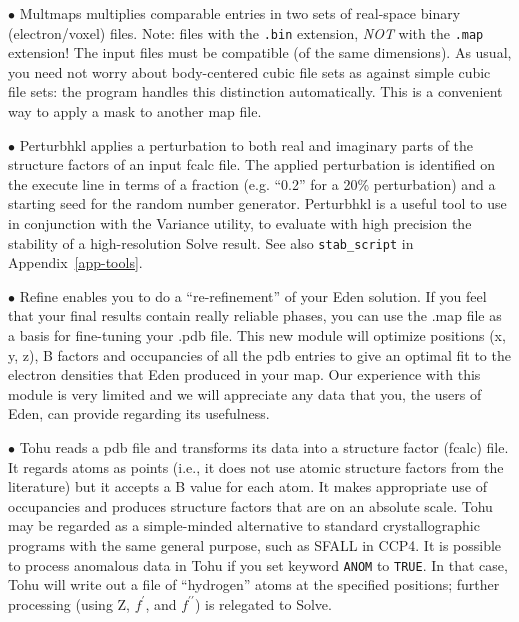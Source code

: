 \documentclass{report}
\begin{document}
{$\bullet$ Multmaps multiplies comparable entries in 
two sets of real-space binary (electron/voxel) files.  Note:  files with the
{\tt .bin} extension, {\em NOT} with the {\tt .map} extension!
The input files must be compatible (of the same 
dimensions).  As usual, you need not worry about body-centered cubic file sets
as against simple cubic file sets: the program handles this distinction 
automatically.  This is a convenient way to apply a mask to another map file.

$\bullet$ Perturbhkl applies a perturbation 
to both real and imaginary parts
of the structure factors of an input fcalc file.  The applied perturbation
is identified on the execute line in terms of a fraction (e.g. ``0.2'' for a
20\% perturbation) and a starting seed for the random number generator.
Perturbhkl is a useful tool to use in conjunction with the 
Variance
utility, to evaluate with high precision the stability of a high-resolution 
Solve result.  See also {\tt stab\_script} in Appendix~\ref{app-tools}.

$\bullet$ Refine enables you to do a ``re-refinement'' of your
Eden solution.  If you feel that your final results contain really reliable
phases, you can use the .map file as a basis for fine-tuning your .pdb file.
This new module will optimize positions (x, y, z), B factors and occupancies 
of all the pdb entries to give an optimal fit to the electron densities that
Eden produced in your map.  Our experience with this module is very limited
and we will appreciate any data that you, the users of Eden, can provide
regarding its usefulness.  

$\bullet$ Tohu reads a pdb file and transforms its data into a 
structure factor (fcalc) file.  It regards atoms as points (i.e., 
it does not use atomic structure factors from the literature) 
but it accepts a B value for each atom.
It makes appropriate use of occupancies and produces structure factors
that are on an absolute scale.  Tohu may be regarded as a 
simple-minded alternative to standard crystallographic programs with the
same general purpose, such as SFALL in CCP4.  It is possible to process anomalous data in 
Tohu if you set keyword {\tt ANOM} 
to {\tt TRUE}.  
In that case, Tohu will write out a file of ``hydrogen'' 
atoms at the specified positions; further
processing (using Z, $f^\prime$, and $f^{\prime\prime}$) 
is relegated to Solve.

}
\end{document}
